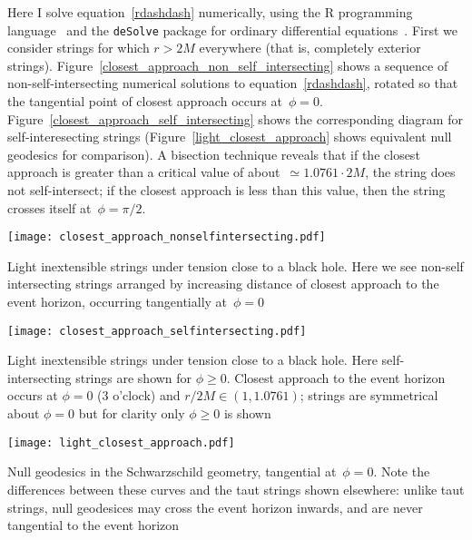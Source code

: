 \documentclass{ws-tpe}
\begin{document}
Here I solve equation~\ref{rdashdash} numerically, using the R
programming language~\cite{rcore2019} and the \verb+deSolve+ package
for ordinary differential equations~\cite{soetart2010}.  First we
consider strings for which $r>2M$ everywhere (that is, completely
exterior strings).
Figure~\ref{closest_approach_non_self_intersecting} shows a sequence
of non-self-intersecting numerical solutions to
equation~\ref{rdashdash}, rotated so that the tangential point of
closest approach occurs at~$\phi=0$.
Figure~\ref{closest_approach_self_intersecting} shows the
corresponding diagram for self-interesecting strings
(Figure~\ref{light_closest_approach} shows equivalent null geodesics
for comparison).  A bisection technique reveals that if the closest
approach is greater than a critical value of about~$\simeq 1.0761\cdot
2M$, the string does not self-intersect; if the closest approach is
less than this value, then the string crosses itself at~$\phi=\pi/2$.

\begin{figurehere} %
  \centerline{
    \texttt{[image: closest\_approach\_nonselfintersecting.pdf]}
  }
  \caption{Light inextensible strings under tension close to a black
    hole.  Here we see non-self intersecting strings arranged by
    increasing distance of closest approach to the event horizon,
    occurring tangentially at~$\phi=0$}
  \label{closest_approach_non_self_intersecting}
\end{figurehere}

\begin{figurehere} %
  \centerline{
    \texttt{[image: closest\_approach\_selfintersecting.pdf]}
  }
  \caption{Light inextensible strings under tension close to a black
    hole.  Here self-intersecting strings are shown for $\phi\geqslant
    0$.  Closest approach to the event horizon occurs at $\phi=0$ (3
    o'clock) and $r/2M\in\left(1,1.0761\right)$; strings are symmetrical
    about $\phi=0$ but for clarity only $\phi\geqslant 0$ is shown}
  \label{closest_approach_self_intersecting}
\end{figurehere}

\begin{figurehere} %
  \centerline{
    \texttt{[image: light\_closest\_approach.pdf]}
  }
  \caption{Null geodesics in the Schwarzschild geometry, tangential
    at~$\phi=0$.  Note the differences between these curves and the taut
    strings shown elsewhere: unlike taut strings, null geodesices may
    cross the event horizon inwards, and are never tangential to the
    event horizon}
  \label{light_closest_approach}
\end{figurehere}
\end{document}
